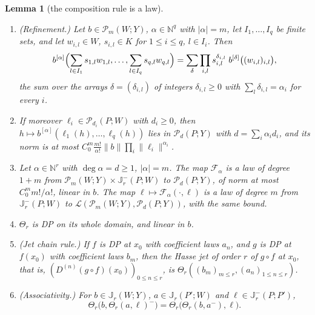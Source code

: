 \documentclass[11pt]{amsart}
\newtheorem{lemma}[theorem]{Lemma}
\theoremstyle{definition}
\theoremstyle{remark}
\numberwithin{equation}{section}
\newcommand{\N}{\mathbb N}
\newcommand{\cL}{\mathcal L}
\newcommand{\abs}[1]{\lvert #1\rvert}
\newcommand{\norm}[1]{\lVert #1\rVert}
\theoremstyle{plain}
\theoremstyle{definition}
\theoremstyle{plain}
\newcommand{\cP}{\mathcal P}
\begin{document}
\begin{lemma}[the composition rule is a law]\label{dp:lem:chain-law}
\leavevmode
\begin{enumerate}
\item \textup{(Refinement.)} Let $b\in\cP_m(W;Y)$, $\alpha\in\N^q$ with $\abs\alpha=m$, let $I_1,\dots,I_q$ be finite sets, and let $w_{i,l}\in W$, $s_{i,l}\in K$ for $1\le i\le q$, $l\in I_i$. Then
\begin{equation}\label{dp:13:eq:refine}
 b^{[\alpha]}\Bigl(\sum_{l\in I_1}s_{1,l}w_{1,l},\dots,\sum_{l\in I_q}s_{q,l}w_{q,l}\Bigr)=\sum_\delta\prod_{i,l}s_{i,l}^{\delta_{i,l}}\;b^{[\delta]}\bigl((w_{i,l})_{i,l}\bigr),
\end{equation}
the sum over the arrays $\delta=(\delta_{i,l})$ of integers $\delta_{i,l}\ge0$ with $\sum_l\delta_{i,l}=\alpha_i$ for every $i$.
\item If moreover $\ell_i\in\cP_{d_i}(P;W)$ with $d_i\ge0$, then $h\mapsto b^{[\alpha]}(\ell_1(h),\dots,\ell_q(h))$ lies in $\cP_d(P;Y)$ with $d=\sum_i\alpha_id_i$, and its norm is at most $C_0^m\frac{m!}{\alpha!}\norm b\prod_i\norm{\ell_i}^{\alpha_i}$.
\item Let $\alpha\in\N^r$ with $\deg\alpha=d\ge1$, $\abs\alpha=m$. The map $\mathcal F_\alpha$ is a law of degree $1+m$ from $\cP_m(W;Y)\times\mathbb J^-_r(P;W)$ to $\cP_d(P;Y)$, of norm at most $C_0^mm!/\alpha!$, linear in $b$. The map $\ell\mapsto\mathcal F_\alpha({\cdot},\ell)$ is a law of degree $m$ from $\mathbb J^-_r(P;W)$ to $\cL(\cP_m(W;Y),\cP_d(P;Y))$, with the same bound.
\item $\Theta_r$ is DP on its whole domain, and linear in $b$.
\item \textup{(Jet chain rule.)} If $f$ is DP at $x_0$ with coefficient laws $a_n$, and $g$ is DP at $f(x_0)$ with coefficient laws $b_m$, then the Hasse jet of order $r$ of $g\circ f$ at $x_0$, that is, $(D^{(n)}(g\circ f)(x_0))_{0\le n\le r}$, is $\Theta_r((b_m)_{m\le r},(a_n)_{1\le n\le r})$.
\item \textup{(Associativity.)} For $b\in\mathbb J_r(W;Y)$, $a\in\mathbb J_r(P';W)$ and $\ell\in\mathbb J^-_r(P;P')$,
\[
 \Theta_r\bigl(b,\Theta_r(a,\ell)^-\bigr)=\Theta_r\bigl(\Theta_r(b,a^-),\ell\bigr).
\]
\end{enumerate}
\end{lemma}
\end{document}

